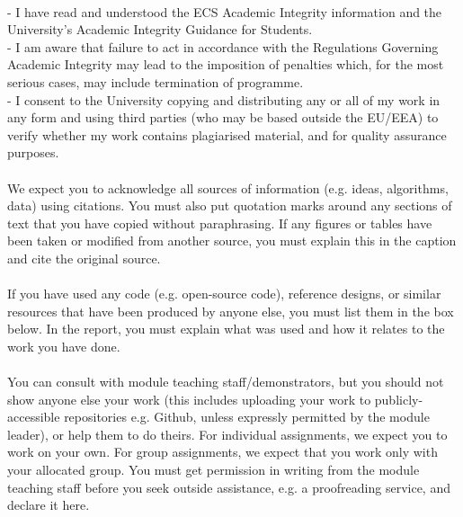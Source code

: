 \documentclass{article}
\begin{document}
\newpage

\\[0.5cm]

- I have read and understood the ECS Academic Integrity information and the University’s
Academic Integrity Guidance for Students.\\

- I am aware that failure to act in accordance with the Regulations Governing Academic Integrity
may lead to the imposition of penalties which, for the most serious cases, may include
termination of programme.\\

- I consent to the University copying and distributing any or all of my work in any form and
using third parties (who may be based outside the EU/EEA) to verify whether my work
contains plagiarised material, and for quality assurance purposes.\\

\\[0.5cm]

We expect you to acknowledge all sources of information (e.g. ideas, algorithms, data) using
citations. You must also put quotation marks around any sections of text that you have copied
without paraphrasing. If any figures or tables have been taken or modified from another source,
you must explain this in the caption and cite the original source.\\

\\[0.5cm]

If you have used any code (e.g. open-source code), reference designs, or similar resources that
have been produced by anyone else, you must list them in the box below. In the report, you must
explain what was used and how it relates to the work you have done.\\


\\[0.5cm]

You can consult with module teaching staff/demonstrators, but you should not show anyone else
your work (this includes uploading your work to publicly-accessible repositories e.g. Github, unless
expressly permitted by the module leader), or help them to do theirs. For individual assignments,
we expect you to work on your own. For group assignments, we expect that you work only with
your allocated group. You must get permission in writing from the module teaching staff before
you seek outside assistance, e.g. a proofreading service, and declare it here.\\
\end{document}
